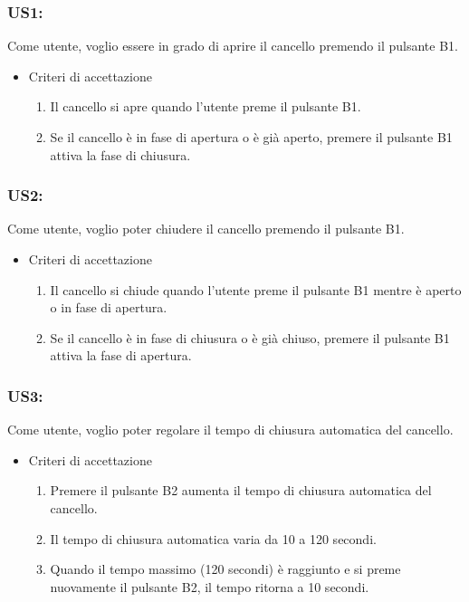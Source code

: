 \documentclass[12pt]{article}
\begin{document}
\subsubsection{US1:}
Come utente, voglio essere in grado di aprire il cancello premendo il pulsante B1.
\begin{itemize}
    \item Criteri di accettazione
    \begin{enumerate}
        \item Il cancello si apre quando l'utente preme il pulsante B1.
        \item Se il cancello è in fase di apertura o è già aperto, premere il pulsante B1 attiva la fase di chiusura.
    \end{enumerate}
\end{itemize}
\subsubsection{US2:}
Come utente, voglio poter chiudere il cancello premendo il pulsante B1.
\begin{itemize}
    \item Criteri di accettazione
    \begin{enumerate}
        \item Il cancello si chiude quando l'utente preme il pulsante B1 mentre è aperto o in fase di apertura.
        \item Se il cancello è in fase di chiusura o è già chiuso, premere il pulsante B1 attiva la fase di apertura.
    \end{enumerate}
\end{itemize}
\subsubsection{US3:}
Come utente, voglio poter regolare il tempo di chiusura automatica del cancello.
\begin{itemize}
    \item Criteri di accettazione
    \begin{enumerate}
        \item Premere il pulsante B2 aumenta il tempo di chiusura automatica del cancello.
        \item Il tempo di chiusura automatica varia da 10 a 120 secondi.
        \item Quando il tempo massimo (120 secondi) è raggiunto e si preme nuovamente il pulsante B2, il tempo ritorna a 10 secondi.
    \end{enumerate}
\end{itemize}
\end{document}
